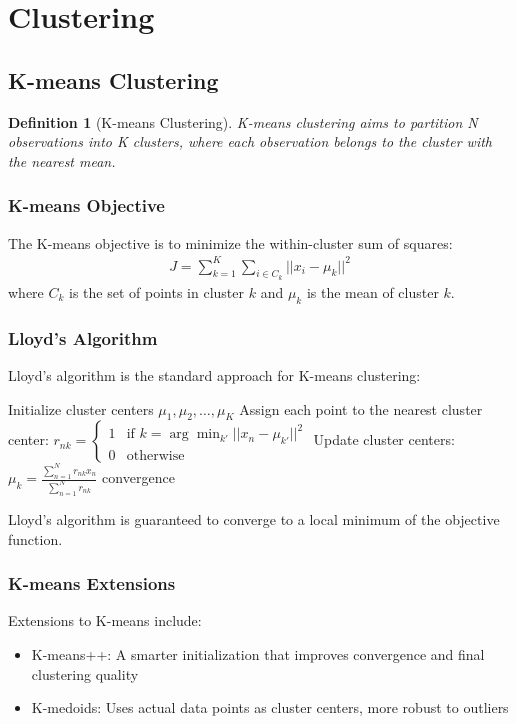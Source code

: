 \documentclass{article}
\newtheorem{definition}{Definition}
\begin{document}
\section{Clustering}

\subsection{K-means Clustering}
\begin{definition}[K-means Clustering]
K-means clustering aims to partition N observations into K clusters, where each observation belongs to the cluster with the nearest mean.
\end{definition}

\subsubsection{K-means Objective}
The K-means objective is to minimize the within-cluster sum of squares:
\begin{align}
J = \sum_{k=1}^{K}\sum_{i \in C_k}||x_i - \mu_k||^2
\end{align}
where $C_k$ is the set of points in cluster $k$ and $\mu_k$ is the mean of cluster $k$.

\subsubsection{Lloyd's Algorithm}
Lloyd's algorithm is the standard approach for K-means clustering:
\begin{algorithm}
\caption{Lloyd's Algorithm for K-means}
\begin{algorithmic}[1]
\State Initialize cluster centers $\mu_1, \mu_2, \ldots, \mu_K$
\Repeat
\State Assign each point to the nearest cluster center:
      $r_{nk} = \begin{cases} 
      1 & \text{if } k = \arg\min_{k'} ||x_n - \mu_{k'}||^2 \\
      0 & \text{otherwise}
      \end{cases}$
\State Update cluster centers:
      $\mu_k = \frac{\sum_{n=1}^{N}r_{nk}x_n}{\sum_{n=1}^{N}r_{nk}}$
\Until convergence
\end{algorithmic}
\end{algorithm}

Lloyd's algorithm is guaranteed to converge to a local minimum of the objective function.

\subsubsection{K-means Extensions}
Extensions to K-means include:
\begin{itemize}
\item K-means++: A smarter initialization that improves convergence and final clustering quality
\item K-medoids: Uses actual data points as cluster centers, more robust to outliers
\end{itemize}
\end{document}
